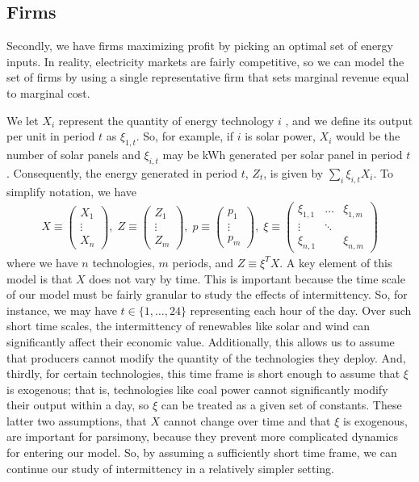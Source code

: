 \documentclass[11pt,a4paper]{extarticle}
\begin{document}
\subsection{Firms}

Secondly, we have firms maximizing profit by picking an optimal set of energy inputs. In reality, electricity markets are fairly competitive, so we can model the set of firms by using a single representative firm that sets marginal revenue equal to marginal cost. 

We let $X_i$  represent the quantity of energy technology $i$ , and we define its output per unit in period $t$ as $\xi_{1,t}$. So, for example, if $i$ is solar power, $X_i$ would be the number of solar panels and $\xi_{i,t}$ may be kWh generated per solar panel in period $t$. Consequently, the energy generated in period $t$, $Z_t$, is given by $\sum_i \xi_{i,t} X_i$. To simplify notation, we have
\begin{align*}
X \equiv \begin{pmatrix}
X_1\\
\vdots\\
X_n
\end{pmatrix} ,\;
Z \equiv \begin{pmatrix}
Z_1\\
\vdots\\
Z_m
\end{pmatrix} ,\;
p \equiv \begin{pmatrix}
p_1\\
\vdots\\
p_m
\end{pmatrix} ,\;
\xi \equiv \begin{pmatrix}
\xi_{1,1} & \dots & \xi_{1,m}\\
\vdots & \ddots & \\
\xi_{n,1} &  & \xi_{n,m}
\end{pmatrix} 
\end{align*}
where we have $n$ technologies, $m$ periods, and $Z \equiv \xi^T X$. A key element of this model is that $X$ does not vary by time. This is important because the time scale of our model must be fairly granular to study the effects of intermittency. So, for instance, we may have $t \in \{ 1, \dots, 24\}$ representing each hour of the day. Over such short time scales, the intermittency of renewables like solar and wind can significantly affect their economic value. Additionally, this allows us to assume that producers cannot modify the quantity of the technologies they deploy. And, thirdly, for certain technologies, this time frame is short enough to assume that $\xi$ is exogenous; that is, technologies like coal power cannot significantly modify their output within a day, so $\xi$ can be treated as a given set of constants. These latter two assumptions, that $X$ cannot change over time and that $\xi$ is exogenous, are important for parsimony, because they prevent more complicated dynamics for entering our model. So, by assuming a sufficiently short time frame, we can continue our study of intermittency in a relatively simpler setting. 
\end{document}
